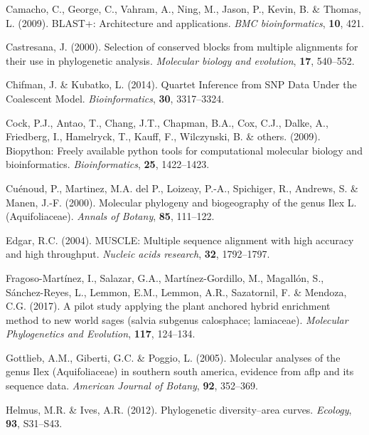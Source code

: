 \documentclass[]{article}
\begin{document}
\leavevmode\hypertarget{ref-camacho2009blast}{}%
Camacho, C., George, C., Vahram, A., Ning, M., Jason, P., Kevin, B. \& Thomas, L. (2009). BLAST+: Architecture and applications. \emph{BMC bioinformatics}, \textbf{10}, 421.

\leavevmode\hypertarget{ref-castresana2000selection}{}%
Castresana, J. (2000). Selection of conserved blocks from multiple alignments for their use in phylogenetic analysis. \emph{Molecular biology and evolution}, \textbf{17}, 540--552.

\leavevmode\hypertarget{ref-chifman2014quartet}{}%
Chifman, J. \& Kubatko, L. (2014). Quartet Inference from SNP Data Under the Coalescent Model. \emph{Bioinformatics}, \textbf{30}, 3317--3324.

\leavevmode\hypertarget{ref-cock2009biopython}{}%
Cock, P.J., Antao, T., Chang, J.T., Chapman, B.A., Cox, C.J., Dalke, A., Friedberg, I., Hamelryck, T., Kauff, F., Wilczynski, B. \& others. (2009). Biopython: Freely available python tools for computational molecular biology and bioinformatics. \emph{Bioinformatics}, \textbf{25}, 1422--1423.

\leavevmode\hypertarget{ref-cuenoud2000molecular}{}%
Cuénoud, P., Martinez, M.A. del P., Loizeay, P.-A., Spichiger, R., Andrews, S. \& Manen, J.-F. (2000). Molecular phylogeny and biogeography of the genus Ilex L.(Aquifoliaceae). \emph{Annals of Botany}, \textbf{85}, 111--122.

\leavevmode\hypertarget{ref-edgar2004muscle}{}%
Edgar, R.C. (2004). MUSCLE: Multiple sequence alignment with high accuracy and high throughput. \emph{Nucleic acids research}, \textbf{32}, 1792--1797.

\leavevmode\hypertarget{ref-fragoso2017pilot}{}%
Fragoso-Martínez, I., Salazar, G.A., Martínez-Gordillo, M., Magallón, S., Sánchez-Reyes, L., Lemmon, E.M., Lemmon, A.R., Sazatornil, F. \& Mendoza, C.G. (2017). A pilot study applying the plant anchored hybrid enrichment method to new world sages (salvia subgenus calosphace; lamiaceae). \emph{Molecular Phylogenetics and Evolution}, \textbf{117}, 124--134.

\leavevmode\hypertarget{ref-gottlieb2005molecular}{}%
Gottlieb, A.M., Giberti, G.C. \& Poggio, L. (2005). Molecular analyses of the genus Ilex (Aquifoliaceae) in southern south america, evidence from aflp and its sequence data. \emph{American Journal of Botany}, \textbf{92}, 352--369.

\leavevmode\hypertarget{ref-helmus2012phylogenetic}{}%
Helmus, M.R. \& Ives, A.R. (2012). Phylogenetic diversity--area curves. \emph{Ecology}, \textbf{93}, S31--S43.
\end{document}
